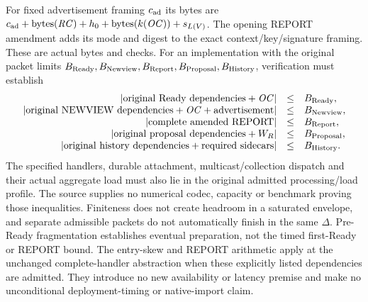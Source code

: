 For fixed advertisement framing $c_{\rm ad}$ its bytes are
$c_{\rm ad}+\operatorname{bytes}(\mathit{RC})+h_0+
\operatorname{bytes}(k(\mathit{OC}))+s_{L(V)}$.
The opening REPORT amendment adds its mode and digest to the exact
context/key/signature framing. These are actual bytes and checks.
For an implementation with the original packet limits
$B_{\rm Ready},B_{\rm Newview},B_{\rm Report},B_{\rm Proposal},B_{\rm History}$,
verification must establish
\[
\begin{array}{rcl}
 |\text{original Ready dependencies}+\mathit{OC}|&\le&B_{\rm Ready},\\
 |\text{original NEWVIEW dependencies}+\mathit{OC}+\text{advertisement}|&\le&B_{\rm Newview},\\
 |\text{complete amended REPORT}|&\le&B_{\rm Report},\\
 |\text{original proposal dependencies}+W_R|&\le&B_{\rm Proposal},\\
 |\text{original history dependencies}+\text{required sidecars}|&\le&B_{\rm History}.
\end{array}
\]
The specified handlers, durable attachment, multicast/collection dispatch
and their actual aggregate load must also lie in the original admitted
processing/load profile. The source supplies no numerical codec,
capacity or benchmark proving those inequalities. Finiteness does not
create headroom in a saturated envelope, and separate admissible packets
do not automatically finish in the same $\Delta$. Pre-Ready fragmentation
establishes eventual preparation, not the timed first-Ready or REPORT
bound. The entry-skew and REPORT arithmetic apply at the unchanged
complete-handler abstraction when these explicitly listed dependencies
are admitted. They introduce no new availability or latency premise and
make no unconditional deployment-timing or native-import claim.
